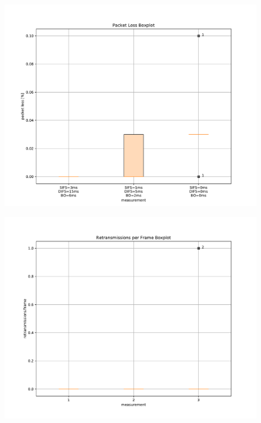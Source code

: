 \documentclass{article}
\begin{document}
\begin{figure}
	\includegraphics[width=\textwidth]{boxplot/packet_loss_boxplot}
\end{figure}

\begin{figure}
	\includegraphics[width=\textwidth]{boxplot/retransmissions_per_frame_boxplot}
\end{figure}
\end{document}
